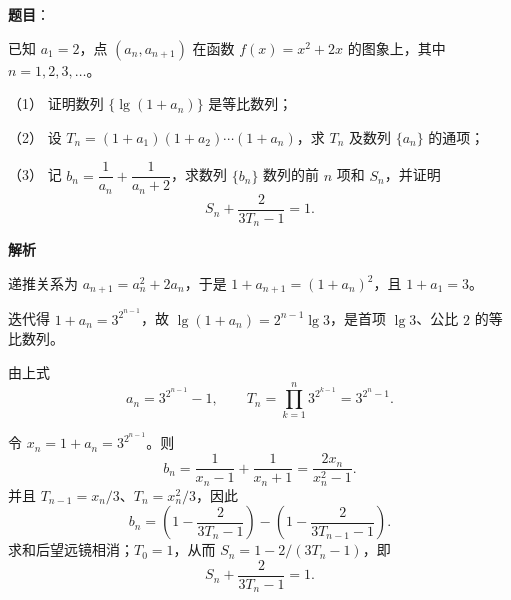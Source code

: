 \begin{answer}

\textbf{题目}：

已知 $a_1=2$，点 $(a_n,a_{n+1})$ 在函数 $f(x)=x^2+2x$ 的图象上，其中 $n=1,2,3,\ldots$。

（1） 证明数列 $\{\lg(1+a_n)\}$ 是等比数列；

（2） 设 $T_n=(1+a_1)(1+a_2)\cdots(1+a_n)$，求 $T_n$ 及数列 $\{a_n\}$ 的通项；

（3） 记 $b_n=\dfrac1{a_n}+\dfrac1{a_n+2}$，求数列 $\{b_n\}$ 数列的前 $n$ 项和 $S_n$，并证明
\nopagebreak[4]
\[
S_n+\dfrac{2}{3T_n-1}=1.
\]

\textbf{解析}

递推关系为 $a_{n+1}=a_n^2+2a_n$，于是 $1+a_{n+1}=(1+a_n)^2$，且 $1+a_1=3$。


迭代得 $1+a_n=3^{2^{n-1}}$，故 $\lg(1+a_n)=2^{n-1}\lg3$，是首项 $\lg3$、公比 $2$ 的等比数列。


由上式
\nopagebreak[4]
\[
a_n=3^{2^{n-1}}-1,\qquad
T_n=\prod_{k=1}^n3^{2^{k-1}}=3^{2^n-1}.
\]


令 $x_n=1+a_n=3^{2^{n-1}}$。则
\nopagebreak[4]
\[
b_n=\frac1{x_n-1}+\frac1{x_n+1}=\frac{2x_n}{x_n^2-1}.
\]
并且 $T_{n-1}=x_n/3$、$T_n=x_n^2/3$，因此
\nopagebreak[4]
\[
b_n=\left(1-\frac{2}{3T_n-1}\right)-\left(1-\frac{2}{3T_{n-1}-1}\right).
\]
求和后望远镜相消；$T_0=1$，从而 $S_n=1-2/(3T_n-1)$，即
\nopagebreak[4]
\[
S_n+\frac{2}{3T_n-1}=1.
\]




\end{answer}